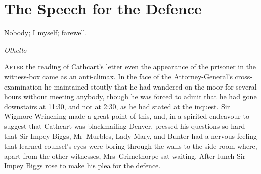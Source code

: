 

\chapter{The Speech for the Defence}

\epigraph{Nobody; I myself; farewell.}{\textit{Othello}}



\lettrine[lines=4]{A}{fter} the reading of Cathcart's letter even the appearance of the prisoner in the witness-box came as an anti-climax. In the face of the Attorney-General's cross-examination he maintained stoutly that he had wandered on the moor for several hours without meeting anybody, though he was forced to admit that he had gone downstairs at 11:30, and not at 2:30, as he had stated at the inquest. Sir Wigmore Wrinching made a great point of this, and, in a spirited endeavour to suggest that Cathcart was blackmailing Denver, pressed his questions so hard that Sir Impey Biggs, Mr~Murbles, Lady Mary, and Bunter had a nervous feeling that learned counsel's eyes were boring through the walls to the side-room where, apart from the other witnesses, Mrs~Grimethorpe sat waiting. After lunch Sir Impey Biggs rose to make his plea for the defence.

